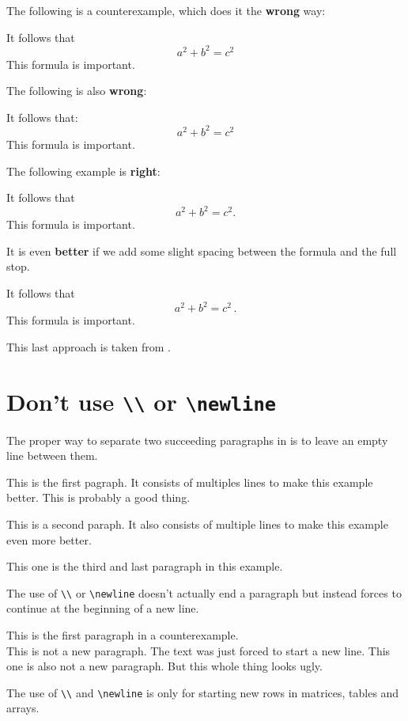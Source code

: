 \documentclass[a4paper, 10pt, abstract=on, headings=standardclasses]{scrartcl}
\begin{document}
The following is a counterexample, which does it the \textbf{wrong} way:
\begin{LTXexample}[pos=r]
  It follows that
  \[
    a^2 + b^2 = c^2
  \]
  This formula is important.
\end{LTXexample}
The following is also \textbf{wrong}:
\begin{LTXexample}[pos=r]
  It follows that:
  \[
    a^2 + b^2 = c^2
  \]
  This formula is important.
\end{LTXexample}
The following example is \textbf{right}:
\begin{LTXexample}[pos=r]
  It follows that
  \[
    a^2 + b^2 = c^2.
  \]
  This formula is important.
\end{LTXexample}
It is even \textbf{better} if we add some slight spacing between the formula and the full stop.
\begin{LTXexample}[pos=r]
  It follows that
  \[
    a^2 + b^2 = c^2 \,.
  \]
  This formula is important.
\end{LTXexample}
This last approach is taken from \cite{tex_period}.





\section{Don’t use \texttt{\textbackslash\textbackslash} or \texttt{{\textbackslash}newline}}

The proper way to separate two succeeding paragraphs in  is to leave an empty line between them.

\begin{LTXexample}[pos = r]
  This is the first pagraph.
  It consists of multiples lines to make this example better.
  This is probably a good thing.
  
  This is a second paraph.
  It also consists of multiple lines to make this example even more better.
  
  This one is the third and last paragraph in this example.
\end{LTXexample}
The use of \texttt{\textbackslash\textbackslash} or \texttt{{\textbackslash}newline} doesn’t actually end a paragraph but instead forces  to continue at the beginning of a new line.
\begin{LTXexample}[pos = r]
  This is the first paragraph in a counterexample.\\
  This is not a new paragraph.
  The text was just forced to start a new line.\newline
  This one is also not a new paragraph.
  But this whole thing looks ugly.
\end{LTXexample}
The use of \texttt{\textbackslash\textbackslash} and \texttt{{\textbackslash}newline} is only for starting new rows in matrices, tables and arrays.
\end{document}
